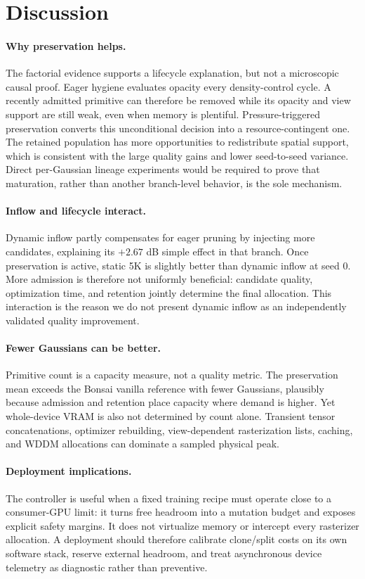 \section{Discussion}
\paragraph{Why preservation helps.}
The factorial evidence supports a lifecycle explanation, but not a microscopic causal proof. Eager hygiene evaluates opacity every density-control cycle. A recently admitted primitive can therefore be removed while its opacity and view support are still weak, even when memory is plentiful. Pressure-triggered preservation converts this unconditional decision into a resource-contingent one. The retained population has more opportunities to redistribute spatial support, which is consistent with the large quality gains and lower seed-to-seed variance. Direct per-Gaussian lineage experiments would be required to prove that maturation, rather than another branch-level behavior, is the sole mechanism.

\paragraph{Inflow and lifecycle interact.}
Dynamic inflow partly compensates for eager pruning by injecting more candidates, explaining its $+2.67$ dB simple effect in that branch. Once preservation is active, static 5K is slightly better than dynamic inflow at seed 0. More admission is therefore not uniformly beneficial: candidate quality, optimization time, and retention jointly determine the final allocation. This interaction is the reason we do not present dynamic inflow as an independently validated quality improvement.

\paragraph{Fewer Gaussians can be better.}
Primitive count is a capacity measure, not a quality metric. The preservation mean exceeds the Bonsai vanilla reference with fewer Gaussians, plausibly because admission and retention place capacity where demand is higher. Yet whole-device VRAM is also not determined by count alone. Transient tensor concatenations, optimizer rebuilding, view-dependent rasterization lists, caching, and WDDM allocations can dominate a sampled physical peak.

\paragraph{Deployment implications.}
The controller is useful when a fixed training recipe must operate close to a consumer-GPU limit: it turns free headroom into a mutation budget and exposes explicit safety margins. It does not virtualize memory or intercept every rasterizer allocation. A deployment should therefore calibrate clone/split costs on its own software stack, reserve external headroom, and treat asynchronous device telemetry as diagnostic rather than preventive.
